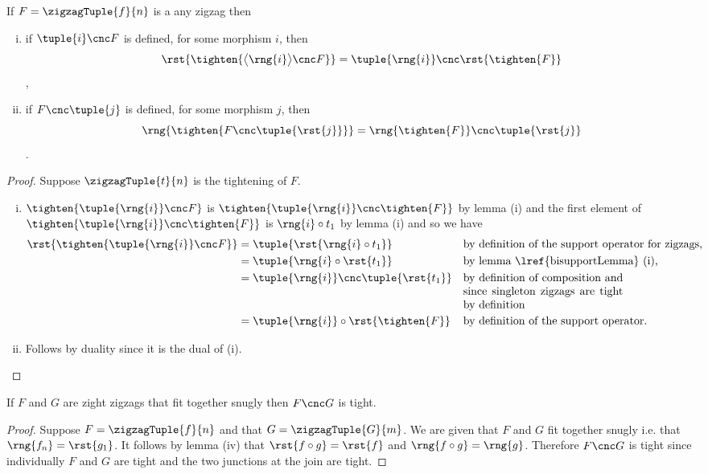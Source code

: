 \begin{lemma}
If $F=\zigzagTuple{f}{n}$ is a any zigzag then
\begin{enumerate}[(i)]
\item if $\tuple{i} \cnc F$ is defined, 
for some morphism $i$,  
then 
$$\rst{\tighten{\bigl\langle \rng{i} \bigr\rangle \cnc F}}
                = \tuple{\rng{i}} \cnc \rst{\tighten{F}}$$, 
\item if $F \cnc \tuple{j}$ is defined, 
for some morphism $j$, then 
$$\rng{\tighten{F \cnc \tuple{\rst{j}}}} 
                = \rng{\tighten{F}} \cnc \tuple{\rst{j}}$$. 
\end{enumerate}
\end{lemma}
\begin{proof}
Suppose $\zigzagTuple{t}{n}$ is the tightening of $F$.
\begin{enumerate}[(i)]
\item %
$\tighten{\tuple{\rng{i}} \cnc F}$ is
$\tighten{\tuple{\rng{i}} \cnc \tighten{F}}$
by lemma 
(i)
and the first element of
$\tighten{\tuple{\rng{i}} \cnc \tighten{F}}$
is $\rng{i} \circ t_1$
by lemma  (i)
and so we have
\begin{align*}
\rst{\tighten{\tuple{\rng{i}} \cnc F}}
&= \tuple{\rst{\rng{i} \circ t_1}}
          && \mbox{by definition of the support operator for zigzags,} \\
&= \tuple{\rng{i} \circ \rst{t_1}}
          && \mbox{by lemma \lref{bisupportLemma} (i),} \\
&= \tuple{\rng{i}} \cnc \tuple{\rst{t_1}}
          && \mbox{\parbox[t]{5cm}{by definition of composition and since singleton zigzags are tight by definition}} \\
&= \tuple{\rng{i}} \circ \rst{\tighten{F}}
          && \mbox{by definition of the support operator.}
\end{align*}
\item %
Follows by duality since it is the dual of (i).
\end{enumerate}
\end{proof}

\begin{lemma}
If $F$ and $G$ are zight zigzags that fit together snugly 
then $F \cnc G$ is tight.
\end{lemma}
\begin{proof}
Suppose $F=\zigzagTuple{f}{n}$ and that $G=\zigzagTuple{G}{m}$.
We are given that $F$ and $G$ fit together snugly 
i.e. that $\rng{f_n}=\rst{g_1}$. It follows by 
lemma  (iv) that 
$\rst{f \circ g}=\rst{f}$ and 
 $\rng{f \circ g} = \rng{g}$. Therefore $F \cnc G$ is tight since individually $F$ and $G$ are tight and the two junctions at the join are tight.
\end{proof} 

